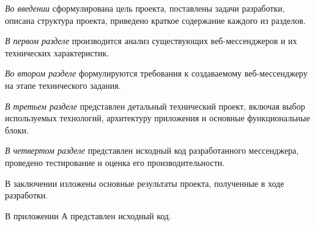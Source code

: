 \emph{Во введении} сформулирована цель проекта, поставлены задачи разработки, описана структура проекта, приведено краткое содержание каждого из разделов.

\emph{В первом разделе} производится анализ существующих веб-мессенджеров и их технических характеристик.

\emph{Во втором разделе} формулируются требования к создаваемому веб-мессенджеру на этапе технического задания.

\emph{В третьем разделе} представлен детальный технический проект, включая выбор используемых технологий, архитектуру приложения и основные функциональные блоки.

\emph{В четвертом разделе} представлен исходный код разработанного мессенджера, проведено тестирование и оценка его производительности.

В заключении изложены основные результаты проекта, полученные в ходе разработки.

В приложении А представлен исходный код.
 
